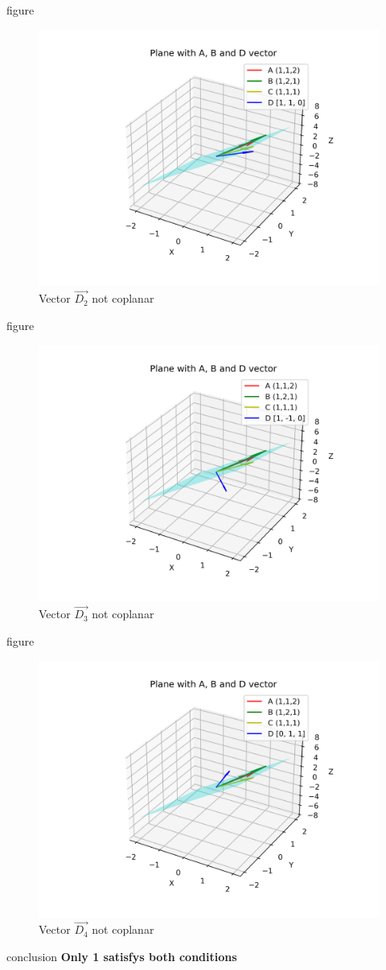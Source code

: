 \documentclass{beamer}
\begin{document}
\begin{frame}{figure}
\begin{figure}[H]
    \centering
    \includegraphics[width=0.6\linewidth]{figures/plane_2.png}
    \caption{Vector $\vec{D_2}$ not coplanar}
\end{figure}
\end{frame}
\begin{frame}{figure}
\begin{figure}[H]
    \centering
    \includegraphics[width=0.6\linewidth]{figures/plane_3.png}
    \caption{Vector $\vec{D_3}$ not coplanar}
\end{figure}
\end{frame}
\begin{frame}{figure}
\begin{figure}[H]
    \centering
    \includegraphics[width=0.6\linewidth]{figures/plane_4.png}
    \caption{Vector $\vec{D_4}$ not coplanar}
\end{figure}
\end{frame}
\begin{frame}{conclusion}
\textbf{\Large Only 1 satisfys both conditions}
\end{frame}
\end{document}
